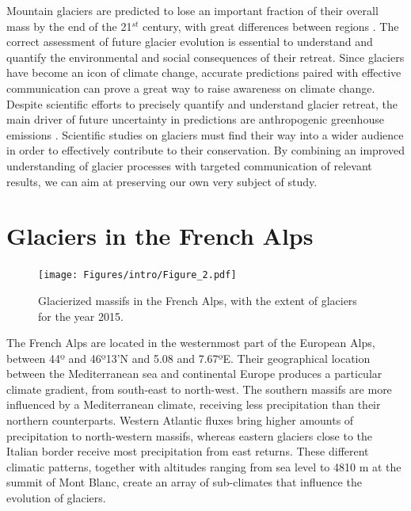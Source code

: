 Mountain glaciers are predicted to lose an important fraction of their overall mass by the end of the 21$^{st}$ century, with great differences between regions \citep{hock_glaciermip_2019}. The correct assessment of future glacier evolution is essential to understand and quantify the environmental and social consequences of their retreat. Since glaciers have become an icon of climate change, accurate predictions paired with effective communication can prove a great way to raise awareness on climate change. Despite scientific efforts to precisely quantify and understand glacier retreat, the main driver of future uncertainty in predictions are anthropogenic greenhouse emissions \citep{marzeion_partitioning_2020}. Scientific studies on glaciers must find their way into a wider audience in order to effectively contribute to their conservation. By combining an improved understanding of glacier processes with targeted communication of relevant results, we can aim at preserving our own very subject of study.  

\section{Glaciers in the French Alps}

\begin{figure}
\centering
\texttt{[image: Figures/intro/Figure\_2.pdf]}
\caption{Glacierized massifs in the French Alps, with the extent of glaciers for the year 2015.}
\label{methods:fig4}
\end{figure}

The French Alps are located in the westernmost part of the European Alps, between 44º and 46º13'N and 5.08 and 7.67ºE. Their geographical location between the Mediterranean sea and continental Europe produces a particular climate gradient, from south-east to north-west. The southern massifs are more influenced by a Mediterranean climate, receiving less precipitation than their northern counterparts. Western Atlantic fluxes bring higher amounts of precipitation to north-western massifs, whereas eastern glaciers close to the Italian border receive most precipitation from east returns. These different climatic patterns, together with altitudes ranging from sea level to 4810 m at the summit of Mont Blanc, create an array of sub-climates that influence the evolution of glaciers. 

